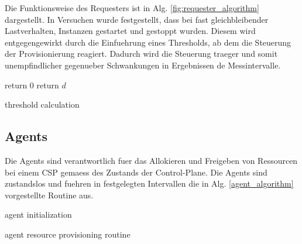 \documentclass[runningheads]{llncs}
\begin{document}
Die Funktionsweise des Requesters ist in Alg. \ref{fig:requester_algorithm} dargestellt. In Versuchen wurde festgestellt, dass bei fast gleichbleibender Lastverhalten, Instanzen gestartet und gestoppt wurden. Diesem wird entgegengewirkt durch die Einfuehrung eines Thresholds, ab dem die Steuerung der Provisionierung reagiert. Dadurch  wird die Steuerung  traeger und somit unempfindlicher gegenueber Schwankungen in Ergebnissen de Messintervalle. \\


\begin{algorithm}[H]
	\DontPrintSemicolon
	{
		return 0
	}
	return $d$
	
	\caption{threshold calculation}
\end{algorithm}

\subsection{Agents}

Die Agents sind verantwortlich fuer das Allokieren und Freigeben von Ressourcen bei einem CSP gemaess des Zustands der Control-Plane. Die Agents sind zustandslos und fuehren in festgelegten Intervallen die in Alg. \ref{agent_algorithm} vorgestellte Routine aus. \\

\begin{algorithm}[H]
	\DontPrintSemicolon
	agent initialization\;
	\caption{agent resource provisioning routine}
	\label{agent_algorithm}
\end{algorithm}
\end{document}
